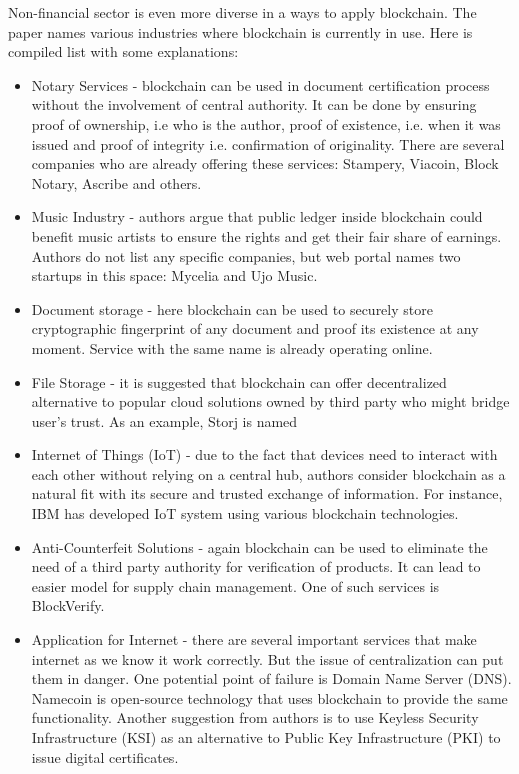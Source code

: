 \documentclass[conference,compsoc]{IEEEtran}
\begin{document}
Non-financial sector is even more diverse in a ways to apply blockchain.
The paper \cite{beyond} names various industries where blockchain is currently in use. 
Here is compiled list with some explanations:
\begin{itemize}
    \item Notary Services - blockchain can be used in document certification process without the involvement of central authority. 
    It can be done by ensuring proof of ownership, i.e who is the author, proof of existence, i.e. when it was issued and proof of integrity i.e. confirmation of originality.
    There are several companies who are already offering these services: Stampery, Viacoin, Block Notary, Ascribe and others.
    
    \item Music Industry - authors argue that public ledger inside blockchain could benefit music artists to ensure the rights and get their fair share of earnings. 
    Authors do not list any specific companies, but web portal \cite{futurethinkers} names two startups in this space: Mycelia and Ujo Music.
    
    \item Document storage - here blockchain can be used to securely store cryptographic fingerprint of any document and proof its existence at any moment. 
    Service with the same name is already operating online.
    
    \item File Storage - it is suggested that blockchain can offer decentralized alternative to popular cloud solutions owned by third party who might bridge user's trust. 
    As an example, Storj is named
    
    \item Internet of Things (IoT) - due to the fact that devices need to interact with each other without relying on a central hub, authors consider blockchain as a natural fit with its secure and trusted exchange of information. 
    For instance, IBM has developed IoT system using various blockchain technologies.
    
    \item Anti-Counterfeit Solutions - again blockchain can be used to eliminate the need of a third party authority for verification of products.
    It can lead to easier model for supply chain management.
    One of such services is BlockVerify.
    
    \item Application for Internet - there are several important services that make internet as we know it work correctly. 
    But the issue of centralization can put them in danger. 
    One potential point of failure is Domain Name Server (DNS). 
    Namecoin is open-source technology that uses blockchain to provide the same functionality.
    Another suggestion from authors is to use Keyless Security Infrastructure (KSI) as an alternative to Public Key Infrastructure (PKI) to issue digital certificates. 
\end{itemize}
\end{document}
